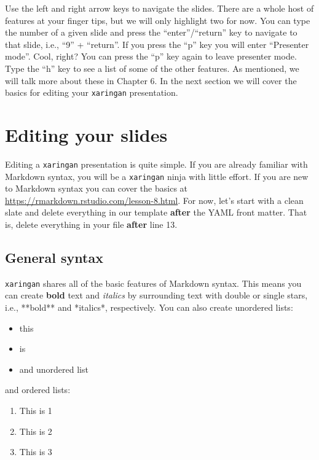\documentclass[
]{book}
\providecommand{\tightlist}{%
  \setlength{\itemsep}{0pt}\setlength{\parskip}{0pt}}
\begin{document}
Use the left and right arrow keys to navigate the slides. There are a whole host of features at your finger tips, but we will only highlight two for now. You can type the number of a given slide and press the ``enter''/``return'' key to navigate to that slide, i.e., ``9'' + ``return''. If you press the ``p'' key you will enter ``Presenter mode''. Cool, right? You can press the ``p'' key again to leave presenter mode. Type the ``h'' key to see a list of some of the other features. As mentioned, we will talk more about these in Chapter 6. In the next section we will cover the basics for editing your \texttt{xaringan} presentation.

\hypertarget{editing-your-slides}{%
\section{Editing your slides}\label{editing-your-slides}}

Editing a \texttt{xaringan} presentation is quite simple. If you are already familiar with Markdown syntax, you will be a \texttt{xaringan} ninja with little effort. If you are new to Markdown syntax you can cover the basics at \url{https://rmarkdown.rstudio.com/lesson-8.html}. For now, let's start with a clean slate and delete everything in our template \textbf{after} the YAML front matter. That is, delete everything in your file \textbf{after} line 13.

\hypertarget{general-syntax}{%
\subsection{General syntax}\label{general-syntax}}

\texttt{xaringan} shares all of the basic features of Markdown syntax. This means you can create \textbf{bold} text and \emph{italics} by surrounding text with double or single stars, i.e., **bold** and *italics*, respectively. You can also create unordered lists:

\begin{itemize}
\tightlist
\item
  this
\item
  is
\item
  and unordered list
\end{itemize}

and ordered lists:

\begin{enumerate}
\def\labelenumi{\arabic{enumi}.}
\tightlist
\item
  This is 1
\item
  This is 2
\item
  This is 3
\end{enumerate}
\end{document}
